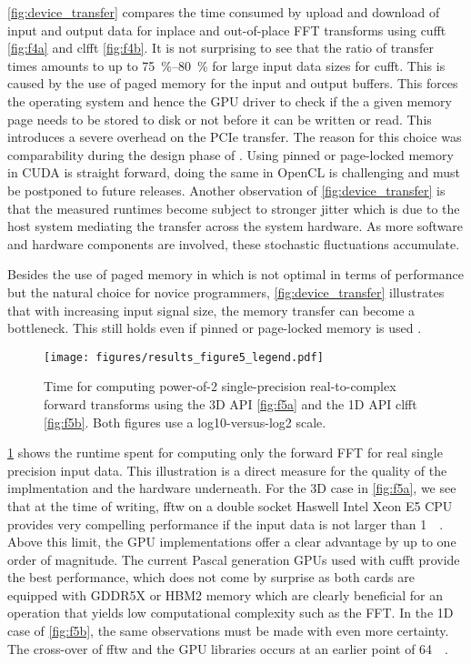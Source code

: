 \cref{fig:device_transfer} compares the time consumed by upload and download of input and output data for inplace and out-of-place FFT transforms using cufft \cref{fig:f4a} and clfft \cref{fig:f4b}. It is not surprising to see that the ratio of transfer times amounts to up to \SIrange{75}{80}{\percent} for large input data sizes for cufft. This is caused by the use of paged memory for the input and output buffers. This forces the operating system and hence the GPU driver to check if the a given memory page needs to be stored to disk or not before it can be written or read. This introduces a severe overhead on the PCIe transfer. The reason for this choice was comparability during the design phase of \gearshifft{}. Using pinned or page-locked memory in CUDA is straight forward, doing the same in OpenCL is challenging and must be postponed to future releases. Another observation of \cref{fig:device_transfer} is that the measured runtimes become subject to stronger jitter  which is due to the host system mediating the transfer across the system hardware. As more software and hardware components are involved, these stochastic fluctuations accumulate. 

Besides the use of paged memory in \gearshifft{} which is not optimal in terms of performance but the natural choice for novice programmers, \cref{fig:device_transfer} illustrates that with increasing input signal size, the memory transfer can become a bottleneck. This still holds even if pinned or page-locked memory is used \cite{steinbach_gtc2015}.

\begin{figure}[!tbp]
  \centering
  \texttt{[image: figures/results\_figure5\_legend.pdf]}
  \hfill
  \caption{Time for computing power-of-2 single-precision real-to-complex forward transforms using the 3D API \cref{fig:f5a} and the 1D API clfft \cref{fig:f5b}. Both figures use a log10-versus-log2 scale.}
  \label{fig:r2c_fwd}
\end{figure}

\cref{fig:r2c_fwd} shows the runtime spent for computing only the forward FFT for real single precision input data. This illustration is a direct measure for the quality of the implmentation and the hardware underneath. For the 3D case in \cref{fig:f5a}, we see that at the time of writing, fftw on a double socket Haswell Intel Xeon E5 CPU provides very compelling performance if the input data is not larger than \SI{1}{\mebi\byte}. Above this limit, the GPU implementations offer a clear advantage by up to one order of magnitude. The current Pascal generation GPUs used with cufft provide the best performance, which does not come by surprise as both cards are equipped with GDDR5X or HBM2 memory which are clearly beneficial for an operation that yields low computational complexity such as the FFT. In the 1D case of \cref{fig:f5b}, the same observations must be made with even more certainty. The cross-over of fftw and the GPU libraries occurs at an earlier point of \SI{64}{\kibi\byte}.  

